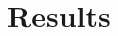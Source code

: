 \doublespacing %

\chapter{Results}
\label{ch3}

\begin{spacing}{1} %
\minitoc %
\end{spacing} %
\thesisspacing %



% 


% 


% 


% 
